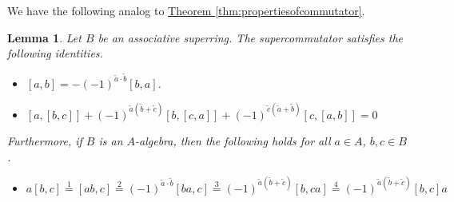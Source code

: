 \documentclass[a4paper]{report}
\theoremstyle{definition}
\theoremstyle{plain}
\newtheorem{lemma}{Lemma}[section]
\theoremstyle{remark}
\begin{document}
We have the following analog to \hyperref[thm:propertiesofcommutator]{Theorem \ref*{thm:propertiesofcommutator}}.
\begin{lemma}
  Let $B$ be an associative superring. The supercommutator satisfies the following identities.
  \begin{itemize}
    \item $[a,b] = -(-1)^{\tilde{a}\cdot \tilde{b}}[b,a]$.
    \item $[a,[b,c]] + (-1)^{\tilde{a}(\tilde{b} + \tilde{c})}[b,[c,a]] + (-1)^{\tilde{c}(\tilde{a}+\tilde{b})}[c,[a,b]] = 0$
  \end{itemize}
  Furthermore, if $B$ is an $A$-algebra, then the following holds for all $a \in A$, $b,c \in B$.
  \begin{itemize}
    \item $a[b,c] \overset{1}{=} [ab,c] \overset{2}{=} (-1)^{\tilde{a}\cdot \tilde{b}}[ba,c] \overset{3}{=} (-1)^{\tilde{a}(\tilde{b} + \tilde{c})}[b,ca] \overset{4}{=} (-1)^{\tilde{a}(\tilde{b} + \tilde{c})}[b,c]a$
  \end{itemize}
\end{lemma}
\end{document}
